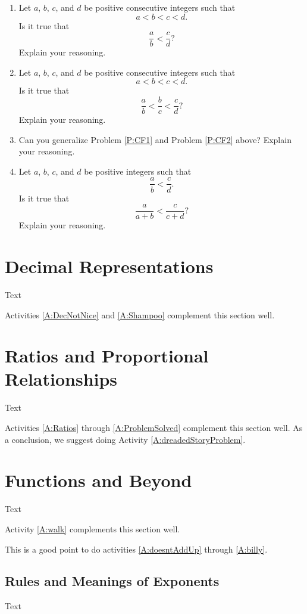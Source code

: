 \begin{problems}
\begin{enumerate}
\item\label{P:CF1} Let $a$, $b$, $c$, and $d$ be positive consecutive
  integers such that
\[
a<b<c<d.
\]
Is it true that 
\[
\frac{a}{b}<\frac{c}{d}?
\]
Explain your reasoning.
\item\label{P:CF2} Let $a$, $b$, $c$, and $d$ be positive consecutive
  integers such that
\[
a<b<c<d.
\]
Is it true that 
\[
\frac{a}{b}<\frac{b}{c}<\frac{c}{d}?
\]
Explain your reasoning.
\item Can you generalize Problem \ref{P:CF1} and Problem \ref{P:CF2}
  above? Explain your reasoning.
\item Let $a$, $b$, $c$, and $d$ be positive integers such that 
\[
\frac{a}{b}<\frac{c}{d}.
\]
Is it true that 
\[
\frac{a}{a+b}<\frac{c}{c+d}?
\]
Explain your reasoning.
\end{enumerate}
\end{problems}

\section{Decimal Representations}
Text

\begin{activitynote}
Activities \ref{A:DecNotNice} and \ref{A:Shampoo} complement this section well. 
\end{activitynote}

\section{Ratios and Proportional Relationships}
Text

\begin{activitynote}
Activities \ref{A:Ratios} through \ref{A:ProblemSolved} complement this section well. 
As a conclusion, we suggest doing Activity \ref{A:dreadedStoryProblem}.
\end{activitynote}

\begin{activitynote}
\end{activitynote}

\section{Functions and Beyond}
Text
\begin{activitynote}
Activity \ref{A:walk} complements this section well.   %
\end{activitynote}

\begin{activitynote}
This is a good point to do activities \ref{A:doesntAddUp} through \ref{A:billy}. 
\end{activitynote}

\subsection{Rules and Meanings of Exponents}
Text





